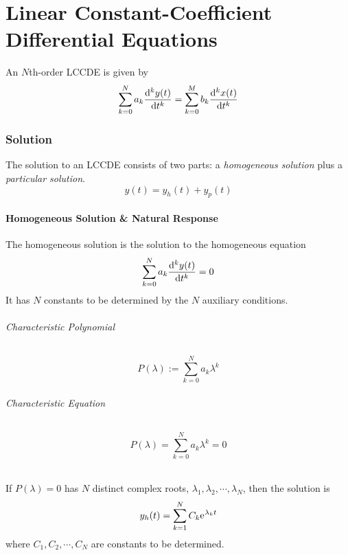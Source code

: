 \documentclass[10pt,UTF8]{article}
\newenvironment{definition box}
{\begin{tcolorbox}[colback=blue!5!white,colframe=blue!75!black,parbox=false,before upper=\par,before lower=\par]}
{\end{tcolorbox}}
\newenvironment{theorem box}
{\begin{tcolorbox}[colback=yellow!5!white,colframe=yellow!75!black,parbox=false,before upper=\par,before lower=\par]}
{\end{tcolorbox}}
\theoremstyle{definition}
\newtheorem{definition inner}{Definition}[section]
\theoremstyle{plain}
\newtheorem{theorem inner}{Theorem}[section]
\theoremstyle{definition}
\newtheorem*{proof inner}{\textit{Proof}}
\theoremstyle{remark}
\newcommand{\e}{\mathrm{e}{\mkern 1 mu}}
\begin{document}
\part{Linear Constant-Coefficient Differential Equations}

An $N$th-order LCCDE is given by
\begin{equation*}
    \sum_{k=0}^N a_k \dv[k]{y(t)}{t}
    =
    \sum_{k=0}^M b_k \dv[k]{x(t)}{t}
\end{equation*}

\section{Solution}

The solution to an LCCDE consists of two parts:
a \emph{homogeneous solution} plus a \emph{particular solution}.
\begin{equation*}
    y(t) = y_h(t) + y_p(t)
\end{equation*}

\subsection{Homogeneous Solution \& Natural Response}

The homogeneous solution is the solution to the homogeneous equation
\begin{equation*}
    \sum_{k=0}^N a_k \dv[k]{y(t)}{t} = 0
\end{equation*}
It has $N$ constants to be determined by the $N$ auxiliary conditions.

\paragraph{Characteristic Polynomial}
\begin{equation*}
    P(\lambda) := \sum_{k=0}^N a_k \lambda^k
\end{equation*}

\paragraph{Characteristic Equation}
\begin{equation*}
    P(\lambda) = \sum_{k=0}^N a_k \lambda^k = 0
\end{equation*}

\vspace{20pt}

\paragraph{}
If $P(\lambda)=0$ has $N$ distinct complex roots,
$\lambda_1, \lambda_2, \cdots, \lambda_N$,
then the solution is
\begin{equation*}
    y_h(t) = \sum_{k=1}^N C_k \e^{\lambda_k t}
\end{equation*}
where $C_1, C_2, \cdots, C_N$ are constants to be determined.
\end{document}
